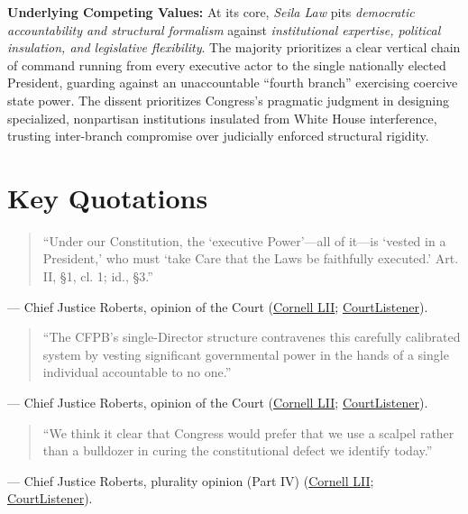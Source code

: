 \documentclass[12pt]{article}
\begin{document}
\textbf{Underlying Competing Values:} At its core, \textit{Seila Law} pits \textit{democratic accountability and structural formalism} against \textit{institutional expertise, political insulation, and legislative flexibility}. The majority prioritizes a clear vertical chain of command running from every executive actor to the single nationally elected President, guarding against an unaccountable ``fourth branch'' exercising coercive state power. The dissent prioritizes Congress's pragmatic judgment in designing specialized, nonpartisan institutions insulated from White House interference, trusting inter-branch compromise over judicially enforced structural rigidity.

\section{Key Quotations}

\begin{quote}
``Under our Constitution, the `executive Power'---all of it---is `vested in a President,' who must `take Care that the Laws be faithfully executed.' Art. II, \S 1, cl. 1; id., \S 3.''
\end{quote}
\noindent --- Chief Justice Roberts, opinion of the Court (\href{https://www.law.cornell.edu/supremecourt/text/19-7}{Cornell LII}; \href{https://www.courtlistener.com/opinion/4764451/seila-law-llc-v-consumer-financial-protection-bureau/}{CourtListener}).

\begin{quote}
``The CFPB's single-Director structure contravenes this carefully calibrated system by vesting significant governmental power in the hands of a single individual accountable to no one.''
\end{quote}
\noindent --- Chief Justice Roberts, opinion of the Court (\href{https://www.law.cornell.edu/supremecourt/text/19-7}{Cornell LII}; \href{https://www.courtlistener.com/opinion/4764451/seila-law-llc-v-consumer-financial-protection-bureau/}{CourtListener}).

\begin{quote}
``We think it clear that Congress would prefer that we use a scalpel rather than a bulldozer in curing the constitutional defect we identify today.''
\end{quote}
\noindent --- Chief Justice Roberts, plurality opinion (Part IV) (\href{https://www.law.cornell.edu/supremecourt/text/19-7}{Cornell LII}; \href{https://www.courtlistener.com/opinion/4764451/seila-law-llc-v-consumer-financial-protection-bureau/}{CourtListener}).
\end{document}
